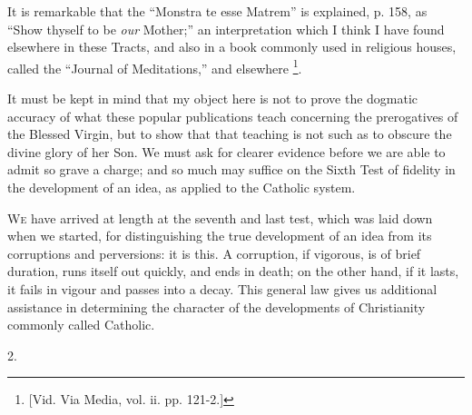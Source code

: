 It is remarkable that the ``Monstra te esse Matrem'' is
explained, p. 158, as ``Show thyself to be \emph{our}
Mother;'' an interpretation which I think I have found elsewhere
in these Tracts, and also in a book commonly used in religious houses,
called the ``Journal of Meditations,'' and elsewhere \footnote{[Vid. Via
Media, vol. ii. pp. 121-2.]}.

It must be kept in mind that my object here is not to prove the
dogmatic accuracy of what these popular publications teach concerning
the prerogatives of the Blessed Virgin, but to show that that teaching
is not such as to obscure the divine glory of her Son. We must ask for
clearer evidence before we are able to admit so grave a charge; and so
much may suffice on the Sixth Test of fidelity in the development of
an idea, as applied to the Catholic system.


W\textsc{e} have arrived at length at the seventh and last test, which was
laid down when we started, for distinguishing the true development of
an idea from its corruptions and perversions: it is this. A
corruption, if vigorous, is of brief duration, runs itself out
quickly, and ends in death; on the other hand, if it lasts, it fails
in vigour and passes into a decay. This general law gives us
additional assistance in determining the character of the developments
of Christianity commonly called Catholic.

2.

